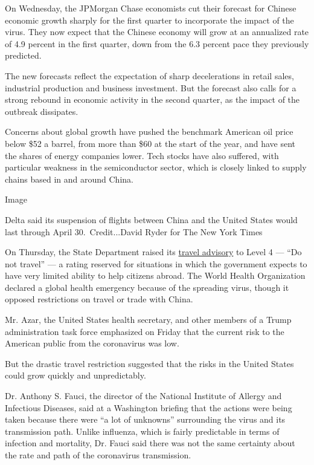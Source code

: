 On Wednesday, the JPMorgan Chase economists cut their forecast for
Chinese economic growth sharply for the first quarter to incorporate the
impact of the virus. They now expect that the Chinese economy will grow
at an annualized rate of 4.9 percent in the first quarter, down from the
6.3 percent pace they previously predicted.

The new forecasts reflect the expectation of sharp decelerations in
retail sales, industrial production and business investment. But the
forecast also calls for a strong rebound in economic activity in the
second quarter, as the impact of the outbreak dissipates.

Concerns about global growth have pushed the benchmark American oil
price below \$52 a barrel, from more than \$60 at the start of the year,
and have sent the shares of energy companies lower. Tech stocks have
also suffered, with particular weakness in the semiconductor sector,
which is closely linked to supply chains based in and around China.

Image

Delta said its suspension of flights between China and the United States
would last through April 30.~Credit...David Ryder for The New York Times

On Thursday, the State Department raised its
\href{https://www.nytimes3xbfgragh.onion/2020/01/30/world/asia/Coronavirus-travel-advisory-.html}{travel
advisory} to Level 4 --- ``Do not travel'' --- a rating reserved for
situations in which the government expects to have very limited ability
to help citizens abroad. The World Health Organization declared a global
health emergency because of the spreading virus, though it opposed
restrictions on travel or trade with China.

Mr. Azar, the United States health secretary, and other members of a
Trump administration task force emphasized on Friday that the current
risk to the American public from the coronavirus was low.

But the drastic travel restriction suggested that the risks in the
United States could grow quickly and unpredictably.

Dr. Anthony S. Fauci, the director of the National Institute of Allergy
and Infectious Diseases, said at a Washington briefing that the actions
were being taken because there were ``a lot of unknowns'' surrounding
the virus and its transmission path. Unlike influenza, which is fairly
predictable in terms of infection and mortality, Dr. Fauci said there
was not the same certainty about the rate and path of the coronavirus
transmission.

